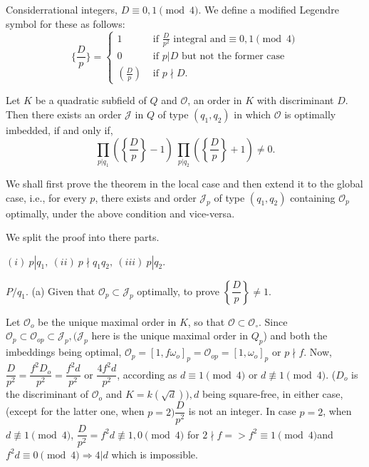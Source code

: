 \begin{defi*}%
  Consider\pageoriginale rational integers, $D \equiv 0, 1 \pmod 4$. We define a
  modified Legendre symbol for these as follows:  
  $$
  \bigg\{\frac{D}{p}\bigg\} = 
  \begin{cases}
    1 & \text { if } \frac{D}{p^2} \text { integral and} \equiv 0, 1 \pmod 4\\
    0 & \text { if } p|D \text{ but not the former case }\\
    \left(\frac{D}{p}\right) & \text { if } p \nmid D.
  \end{cases} 
  $$
\end{defi*}

\begin{theorem}\label{chap4:sec9:thm3}%
  Let $K$ be a quadratic subfield of $Q$ and $\mathscr{O}$, an order
  in $K$ with discriminant $D$. Then there exists an order
  $\mathcal{J}$ in $Q$ of type $(q_1, q_2)$ in which $\mathscr{O}$ is
  optimally imbedded, if and only if, 
  $$
  \prod_{p | q_1} \left( \left\{ \frac{D} {p}\right\} - 1 \right)~
  \prod_{p | q_2} \left( \left\{ \frac{D} {p}\right\} + 1 \right) \neq 0. 
  $$
\end{theorem}

We shall first prove the theorem in the local case and then extend it
to the global case, i.e., for every $p$, there exists and order
$\mathcal{J}_p$ of type $(q_1, q_2)$ containing $\mathscr{O}_p$
optimally, under the above condition and vice-versa. 

We split the proof into there parts.

$(i)~ p | q_1, ~(ii)~ p \nmid q_1 q_2, ~(iii) ~p | q_2 $.

\begin{case}[(i) ]\label{chap4:sec9:thm3:case1}
$P / q_1.$ (a) Given that $\mathscr{O}_p \subset
  \mathcal{J}_p$ optimally, to prove $ \left\{\dfrac{D} {p}\right\} \neq
  1 $.  
\end{case}

Let $\mathscr{O}_o$ be the unique maximal order in $K$, so that
$\mathscr{O} \subset \mathscr{O}_\circ$. Since $\mathscr{O}_p \subset
\mathscr{O}_{op} \subset \mathcal{J}_p, (\mathcal{J}_p$ here is the
unique maximal order in $Q_p$) and both the imbeddings being optimal,
$\mathscr{O}_p = [1, f \omega_o]_p = \mathscr{O}_{op} = [1,
  \omega_o]_p $ or $p \nmid f$. Now, $\dfrac{D}{p^2} =
\dfrac{f^2D_o}{p^2} = \dfrac{f^2 d }{p^2}$ or $\dfrac{4f^2 d}{p^2}$,
according as $d \equiv 1 \pmod 4$ or $d \nequiv 1 \pmod 4$. ($D_o$
is the discriminant of $\mathscr{O}_o$ and $K = k (\sqrt{d})), d$
being square-free, in either case, (except for the latter one, when $p
= 2 ) \dfrac{D}{p^2}$ is not an integer. In case $p = 2$, when $d
\nequiv 1 \pmod 4$, $\dfrac{D}{p^2} = f^2 d \nequiv 1, 0 \pmod 4$
for $2 \nmid f  = > f^2 \equiv 1 \pmod 4$\pageoriginale  and $f^2 d \equiv 0 \pmod
4 \Longrightarrow 4 | d$ which is impossible. 

